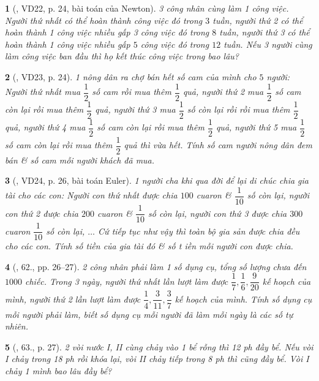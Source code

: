 \documentclass{article}
\newtheorem{baitoan}{}
\begin{document}
\begin{baitoan}[\cite{Binh_Toan_6_tap_2}, VD22, p. 24, bài toán của Newton]
	3 công nhân cùng làm 1 công việc. Người thứ nhất có thể hoàn thành công việc đó trong $3$ tuần, người thứ 2 có thể hoàn thành 1 công việc nhiều gấp 3 công việc đó trong $8$ tuần, người thứ 3 có thể hoàn thành 1 công việc nhiều gấp $5$ công việc đó trong $12$ tuần. Nếu 3 người cùng làm công việc ban đầu thì họ kết thúc công việc trong bao lâu?
\end{baitoan}

\begin{baitoan}[\cite{Binh_Toan_6_tap_2}, VD23, p. 24]
	1 nông dân ra chợ bán hết số cam của mình cho $5$ người: Người thứ nhất mua $\dfrac{1}{2}$ số cam rồi mua thêm $\dfrac{1}{2}$ quả, người thứ 2 mua $\dfrac{1}{2}$ số cam còn lại rồi mua thêm $\dfrac{1}{2}$ quả, người thứ 3 mua $\dfrac{1}{2}$ số còn lại rồi rồi mua thêm $\dfrac{1}{2}$ quả, người thứ 4 mua $\dfrac{1}{2}$ số cam còn lại rồi mua thêm $\dfrac{1}{2}$ quả, người thứ 5 mua $\dfrac{1}{2}$ số cam còn lại rồi mua thêm $\dfrac{1}{2}$ quả thì vừa hết. Tính số cam người nông dân đem bán \& số cam mỗi người khách đã mua.
\end{baitoan}

\begin{baitoan}[\cite{Binh_Toan_6_tap_2}, VD24, p. 26, bài toán Euler]
	1 người cha khi qua đời để lại di chúc chia gia tài cho các con: Người con thứ nhất được chia $100$ cuaron \& $\dfrac{1}{10}$ số còn lại, người con thứ 2  được chia $200$ cuaron \& $\dfrac{1}{10}$ số còn lại, người con thứ 3 được chia $300$ cuaron $\dfrac{1}{10}$ số còn lại, $\ldots$ Cứ tiếp tục như vậy thì toàn bộ gia sản được chia đều cho các con. Tính số tiền của gia tài đó \& số t iền mỗi người con được chia.
\end{baitoan}

\begin{baitoan}[\cite{Binh_Toan_6_tap_2}, 62., pp. 26--27]
	2 công nhân phải làm 1 số dụng cụ, tổng số lượng chưa đến $1000$ chiếc. Trong 3 ngày, người thứ nhất lần lượt làm được $\dfrac{1}{7},\dfrac{1}{6},\dfrac{9}{20}$ kế hoạch của mình, người thứ 2 lần lượt làm được $\dfrac{1}{4},\dfrac{3}{11},\dfrac{3}{7}$ kế hoạch của mình. Tính số dụng cụ mỗi người phải làm, biết số dụng cụ mỗi người đã làm mỗi ngày là các số tự nhiên.
\end{baitoan}

\begin{baitoan}[\cite{Binh_Toan_6_tap_2}, 63., p. 27]
	2 vòi nước I, II cùng chảy vào 1 bể rỗng thì {\rm12 ph} đầy bể. Nếu vòi I chảy trong {\rm18 ph} rồi khóa lại, vòi II chảy tiếp trong {\rm8 ph} thì cũng đầy bể. Vòi I chảy 1 mình bao lâu đầy bể?
\end{baitoan}
\end{document}
